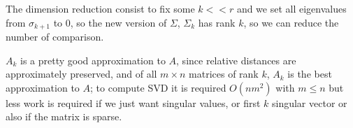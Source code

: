 The dimension reduction consist to fix some $k << r$ and we set all eigenvalues from $\sigma_{k+1}$ to $0$, so the new version of $\Sigma$, $\Sigma_k$ has 
rank $k$, so we can reduce the number of comparison.

$A_k$ is a pretty good approximation to $A$, since relative distances are
approximately preserved, and of all $m \times n$ matrices of rank $k$,
$A_k$ is the best approximation to $A$; to compute SVD it is required $O(nm^2)$
with $m \leq n$ but less work is required if we just want singular values, or
first $k$ singular vector or also if the matrix is sparse.

